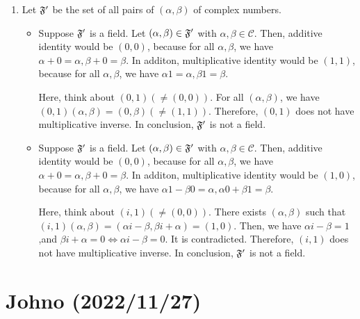 \documentclass{article}
\theoremstyle{thmstyleone}
\theoremstyle{thmstyletwo}
\theoremstyle{thmstylethree}
\newcommand\C{\mathcal C}
\begin{document}
\begin{enumerate}[label = (\alph*)]
\begin{enumerate}[label=(\Alph*)]
\item $(\alpha_1,\beta_1)((\alpha_2,\beta_2) + (\alpha_3,\beta_3)) = (\alpha_1,\beta_1)(\alpha_2+\alpha_3,\beta_2+\beta_3) = (\alpha_1\alpha_2 + \alpha_1\alpha_3-\beta_1\beta_2-\beta_1\beta_3,\alpha_1\beta_2+\alpha_1\beta_3+\beta_1\alpha_2+\beta_1\alpha_3) = (\alpha_1\alpha_2 - \beta_1\beta_2,\alpha_1\beta_2 + \beta_1\alpha_2) + (\alpha_1\alpha_3 - \beta_1\beta_3,\alpha_1\beta_3 + \alpha_3\beta_1) = (\alpha_1,\beta_1)(\alpha_2,\beta_2) + (\alpha_1,\beta_1)(\alpha_3,\beta_3)$.(distributive law stands)
\end{enumerate}
\item
Let $\mathfrak F'$ be the set of all pairs of $(\alpha,\beta)$ of complex numbers.
\begin{itemize}
\item[(a)]
Suppose $\mathfrak F'$ is a field.
Let $(\alpha,\beta) \in \mathfrak F'$ with $\alpha,\beta \in \C$. 
Then, additive identity would be $(0,0)$, because for all $\alpha,\beta$, we have $\alpha + 0 = \alpha, \beta + 0 = \beta$.
In additon, multiplicative identity would be $(1,1)$, because for all $\alpha,\beta$, we have $\alpha1 = \alpha, \beta1 = \beta$.

Here, think about $(0,1) (\ne (0,0))$.
For all $(\alpha, \beta)$, we have $(0,1)(\alpha, \beta) = (0, \beta) (\ne (1,1))$. Therefore, $(0,1)$ does not have multiplicative inverse.
In conclusion, $\mathfrak F'$ is not a field. 
\item[(b)]
Suppose $\mathfrak F'$ is a field.
Let $(\alpha,\beta) \in \mathfrak F'$ with $\alpha, \beta \in \C$. 
Then, additive identity would be $(0,0)$, because for all $\alpha,\beta$, we have $\alpha + 0 = \alpha, \beta + 0 = \beta$.
In additon, multiplicative identity would be $(1,0)$, because for all $\alpha,\beta$, we have $\alpha1 - \beta0 = \alpha, \alpha0 + \beta1 = \beta$.

Here, think about $(i,1) (\ne (0,0))$.
There exists $(\alpha, \beta)$ such that $(i,1)(\alpha, \beta) = (\alpha i -\beta, \beta i + \alpha) = (1,0)$. 
Then, we have $\alpha i -\beta = 1$,and $\beta i + \alpha = 0 \iff \alpha i -\beta = 0$. It is contradicted.
Therefore, $(i,1)$ does not have multiplicative inverse.
In conclusion, $\mathfrak F'$ is not a field. 
\end{itemize}
\end{enumerate}

\section{Johno (2022/11/27)}
\end{document}
